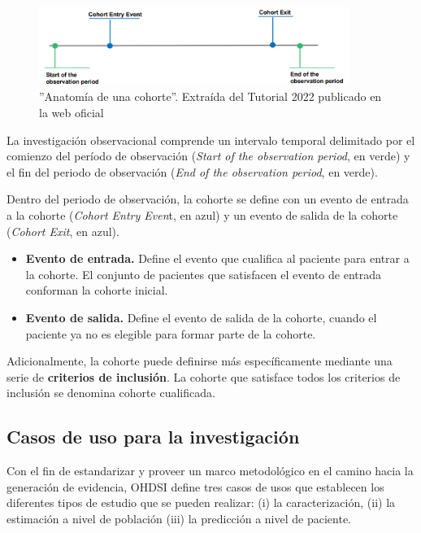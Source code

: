 \begin{figure}[H]
\centering
\includegraphics[width=0.90\textwidth]{figures/cohortAnatomy.png}
     \caption{''Anatomía de una cohorte''. Extraída del Tutorial 2022 publicado en la web oficial \cite{OHDSIwebsite}}
    \label{fig:cohortAnatomy}
\end{figure}

La investigación observacional comprende un intervalo temporal delimitado por el comienzo del período de  observación (\textit{Start of the observation period}, en verde) y el fin del periodo de observación (\textit{End of the observation period}, en verde).

Dentro del periodo de observación, la cohorte se define con un  evento de entrada a la cohorte (\textit{Cohort Entry Even}t, en azul) y un evento de salida de la cohorte (\textit{Cohort Exit}, en azul). 

\begin{itemize}

    \item \textbf{Evento de entrada.} Define el evento que cualifica al paciente para entrar a la cohorte. El conjunto de pacientes que satisfacen el evento de entrada conforman la cohorte inicial. 

    \item \textbf{Evento de salida.} Define el evento de salida de la cohorte, cuando el paciente ya no es elegible para formar parte de la cohorte.

\end{itemize}

Adicionalmente, la cohorte puede definirse más específicamente mediante una serie de \textbf{criterios de inclusión}. La cohorte que satisface todos los criterios de inclusión se denomina cohorte cualificada.



\subsection{Casos de uso para la investigación} \label{subsec:05casosUso}

Con el fin de estandarizar y proveer un marco metodológico en el camino hacia la generación de evidencia, OHDSI define tres casos de usos que establecen los diferentes tipos de estudio que se pueden realizar: (i) la caracterización, (ii) la estimación a nivel de población (iii) la predicción a nivel de paciente.


